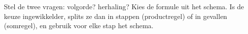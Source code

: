 \begin{werkwijze}
Stel de twee vragen: volgorde? herhaling? Kies de formule uit het schema. Is de keuze ingewikkelder, splits ze dan in stappen (productregel) of in gevallen (somregel), en gebruik voor elke stap het schema.
\end{werkwijze}

\begin{oefeningen}
\end{oefeningen}

\opdrachtenkop

\begin{oefeningen}



























\end{oefeningen}


